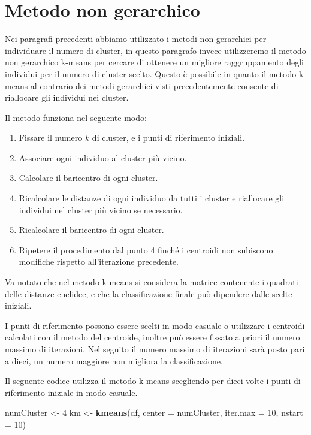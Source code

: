 \documentclass[]{book}
\newenvironment{Shaded}{\begin{snugshade}}{\end{snugshade}}
\newcommand{\KeywordTok}[1]{\textcolor[rgb]{0.13,0.29,0.53}{\textbf{#1}}}
\newcommand{\DataTypeTok}[1]{\textcolor[rgb]{0.13,0.29,0.53}{#1}}
\newcommand{\DecValTok}[1]{\textcolor[rgb]{0.00,0.00,0.81}{#1}}
\newcommand{\StringTok}[1]{\textcolor[rgb]{0.31,0.60,0.02}{#1}}
\newcommand{\NormalTok}[1]{#1}
\providecommand{\tightlist}{%
  \setlength{\itemsep}{0pt}\setlength{\parskip}{0pt}}
\begin{document}
\section{Metodo non gerarchico}\label{metodo-non-gerarchico}

Nei paragrafi precedenti abbiamo utilizzato i metodi non gerarchici per
individuare il numero di cluster, in questo paragrafo invece
utilizzeremo il metodo non gerarchico k-means per cercare di ottenere un
migliore raggruppamento degli individui per il numero di cluster scelto.
Questo è possibile in quanto il metodo k-means al contrario dei metodi
gerarchici visti precedentemente consente di riallocare gli individui
nei cluster.

Il metodo funziona nel seguente modo:

\begin{enumerate}
\def\labelenumi{\arabic{enumi}.}
\tightlist
\item
  Fissare il numero \(k\) di cluster, e i punti di riferimento iniziali.
\item
  Associare ogni individuo al cluster più vicino.
\item
  Calcolare il baricentro di ogni cluster.
\item
  Ricalcolare le distanze di ogni individuo da tutti i cluster e
  riallocare gli individui nel cluster più vicino se necessario.
\item
  Ricalcolare il baricentro di ogni cluster.
\item
  Ripetere il procedimento dal punto 4 finché i centroidi non subiscono
  modifiche rispetto all'iterazione precedente.
\end{enumerate}

Va notato che nel metodo k-means si considera la matrice contenente i
quadrati delle distanze euclidee, e che la classificazione finale può
dipendere dalle scelte iniziali.

I punti di riferimento possono essere scelti in modo casuale o
utilizzare i centroidi calcolati con il metodo del centroide, inoltre
può essere fissato a priori il numero massimo di iterazioni. Nel seguito
il numero massimo di iterazioni sarà posto pari a dieci, un numero
maggiore non migliora la classificazione.

Il seguente codice utilizza il metodo k-means scegliendo per dieci volte
i punti di riferimento iniziale in modo casuale.

\begin{Shaded}
\begin{Highlighting}[]
\NormalTok{numCluster <-}\StringTok{ }\DecValTok{4}
\NormalTok{km <-}\StringTok{ }\KeywordTok{kmeans}\NormalTok{(df, }\DataTypeTok{center =}\NormalTok{ numCluster, }\DataTypeTok{iter.max =} \DecValTok{10}\NormalTok{, }\DataTypeTok{nstart =} \DecValTok{10}\NormalTok{)}
\end{Highlighting}
\end{Shaded}
\end{document}

